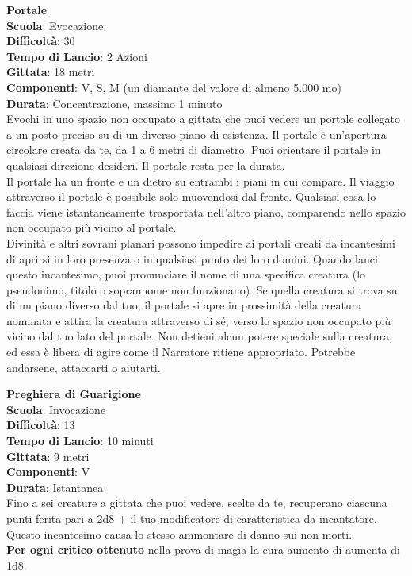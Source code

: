 \begin{multicols}{2}
\medskip\textbf{Portale}\\
\textbf{Scuola}: Evocazione\\
\textbf{Difficoltà}: 30\\
\textbf{Tempo di Lancio}: 2 Azioni\\
\textbf{Gittata}: 18 metri\\
\textbf{Componenti}: V, S, M (un diamante del valore di almeno 5.000 mo)\\
\textbf{Durata}: Concentrazione, massimo 1 minuto\\
Evochi in uno spazio non occupato a gittata che puoi vedere un portale collegato a un posto preciso su di un diverso piano di esistenza. Il portale è un'apertura circolare creata da te, da 1 a 6 metri di diametro. Puoi orientare il portale in qualsiasi direzione desideri. Il portale resta per la durata.\\
Il portale ha un fronte e un dietro su entrambi i piani in cui compare. Il viaggio attraverso il portale è possibile solo muovendosi dal fronte. Qualsiasi cosa lo faccia viene istantaneamente trasportata nell'altro piano, comparendo nello spazio non occupato più vicino al portale.\\
Divinità e altri sovrani planari possono impedire ai portali creati da incantesimi di aprirsi in loro presenza o in qualsiasi punto dei loro domini. Quando lanci questo incantesimo, puoi pronunciare il nome di una specifica creatura (lo pseudonimo, titolo o soprannome non funzionano). Se quella creatura si trova su di un piano diverso dal tuo, il portale si apre in prossimità della creatura nominata e attira la creatura attraverso di sé, verso lo spazio non occupato più vicino dal tuo lato del portale. Non detieni alcun potere speciale sulla creatura, ed essa è libera di agire come il Narratore ritiene appropriato. Potrebbe andarsene, attaccarti o aiutarti.

\medskip\textbf{Preghiera di Guarigione}\\
\textbf{Scuola}: Invocazione\\
\textbf{Difficoltà}: 13\\
\textbf{Tempo di Lancio}: 10 minuti\\
\textbf{Gittata}: 9 metri\\
\textbf{Componenti}: V\\
\textbf{Durata}: Istantanea\\
Fino a sei creature a gittata che puoi vedere, scelte da te, recuperano ciascuna punti ferita pari a 2d8 + il tuo modificatore di caratteristica da incantatore. Questo incantesimo causa lo stesso ammontare di danno sui non morti.\\
\textbf{Per ogni critico ottenuto} nella prova di magia la cura aumento di aumenta di 1d8.


\end{multicols}
